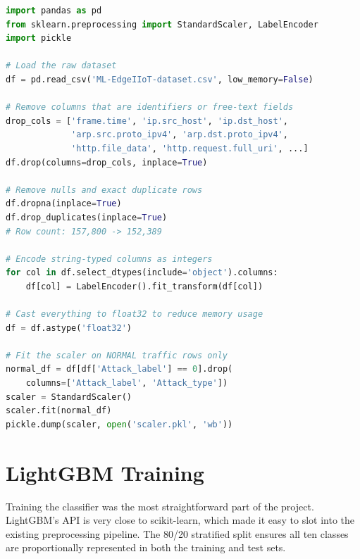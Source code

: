 \documentclass[12pt,a4paper]{report}
\begin{document}
\begin{lstlisting}[language=Python, caption={Key preprocessing steps from Notebook 01}]
import pandas as pd
from sklearn.preprocessing import StandardScaler, LabelEncoder
import pickle

# Load the raw dataset
df = pd.read_csv('ML-EdgeIIoT-dataset.csv', low_memory=False)

# Remove columns that are identifiers or free-text fields
drop_cols = ['frame.time', 'ip.src_host', 'ip.dst_host',
             'arp.src.proto_ipv4', 'arp.dst.proto_ipv4',
             'http.file_data', 'http.request.full_uri', ...]
df.drop(columns=drop_cols, inplace=True)

# Remove nulls and exact duplicate rows
df.dropna(inplace=True)
df.drop_duplicates(inplace=True)
# Row count: 157,800 -> 152,389

# Encode string-typed columns as integers
for col in df.select_dtypes(include='object').columns:
    df[col] = LabelEncoder().fit_transform(df[col])

# Cast everything to float32 to reduce memory usage
df = df.astype('float32')

# Fit the scaler on NORMAL traffic rows only
normal_df = df[df['Attack_label'] == 0].drop(
    columns=['Attack_label', 'Attack_type'])
scaler = StandardScaler()
scaler.fit(normal_df)
pickle.dump(scaler, open('scaler.pkl', 'wb'))
\end{lstlisting}

\section{LightGBM Training}

Training the classifier was the most straightforward part of the project.
LightGBM's API is very close to scikit-learn, which made it easy to slot into
the existing preprocessing pipeline. The 80/20 stratified split ensures all
ten classes are proportionally represented in both the training and test sets.
\end{document}
